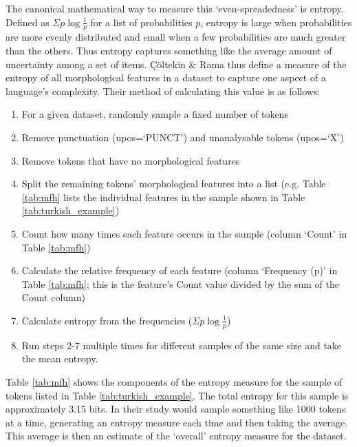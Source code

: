 \documentclass[USenglish]{article}
\begin{document}
The canonical mathematical way to measure this `even-spreadedness' is entropy.
Defined as $\Sigma p \log{\frac{1}{p}}$ for a list of probabilities $p$, entropy is large when probabilities are more evenly distributed and small when a few probabilities are much greater than the others.
Thus entropy captures something like the average amount of uncertainty among a set of items.
Çöltekin \& Rama thus define a measure of the entropy of all morphological features in a dataset to capture one aspect of a language's complexity.
Their method of calculating this value is as follows:
\begin{enumerate}
\item For a given dataset, randomly sample a fixed number of tokens
\item Remove punctuation (upos=`PUNCT') and unanalysable tokens (upos=`X')
\item Remove tokens that have no morphological features
\item Split the remaining tokens' morphological features into a list (e.g. Table \ref{tab:mfh} lists the individual features in the sample shown in Table \ref{tab:turkish_example})
\item Count how many times each feature occurs in the sample (column `Count' in Table \ref{tab:mfh})
\item Calculate the relative frequency of each feature (column `Frequency (p)' in Table \ref{tab:mfh}; this is the feature's Count value divided by the sum of the Count column)
\item Calculate entropy from the frequencies ($\Sigma p \log{\frac{1}{p}}$)
\item Run steps 2-7 multiple times for different samples of the same size and take the mean entropy.
\end{enumerate}

\noindent Table \ref{tab:mfh} shows the components of the entropy measure for the sample of tokens listed in Table \ref{tab:turkish_example}.
The total entropy for this sample is approximately 3.15 bits.
In their study \citet{ccoltekin2023complexity} would sample something like 1000 tokens at a time, generating an entropy measure each time and then taking the average.
This average is then an estimate of the `overall' entropy measure for the dataset.
\end{document}
